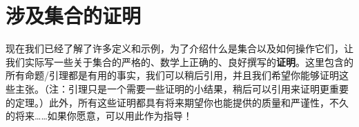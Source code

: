 \section{涉及集合的证明}\label{sec:section3.9}

现在我们已经了解了许多定义和示例，为了介绍什么是集合以及如何操作它们，让我们实际写一些关于集合的严格的、数学上正确的、良好撰写的\textbf{证明}。这里包含的所有命题/引理都是有用的事实，我们可以稍后引用，并且我们希望你能够证明这些主张。（注：引理只是一个需要一些证明的小结果，稍后可以引用来证明更重要的定理。）此外，所有这些证明都具有将来期望你也能提供的质量和严谨性，不久的将来……如果你愿意，可以用此作为指导！









